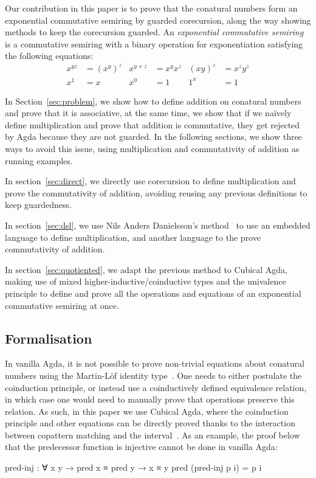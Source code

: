 Our contribution in this paper is to prove that the conatural numbers form an
exponential commutative semiring by guarded corecursion, along the way showing
methods to keep the corecursion guarded. An \emph{exponential commutative
semiring} is a commutative semiring with a binary operation for exponentiation
satisfying the following equations:
\begin{align*}
  x^{yz} &= (x^y)^z & x^{y+z} &= x^y x^z & (xy)^z &= x^z y^z \\
  x^1 &= x & x^0 &= 1 & 1^x &= 1
\end{align*}

In Section~\ref{sec:problem}, we show how to define addition on conatural
numbers and prove that it is associative, at the same time, we show that if we
naïvely define multiplication and prove that addition is commutative, they get
rejected by Agda because they are not guarded. In the following sections, we
show three ways to avoid this issue, using multiplication and commutativity of
addition as running examples.

In section~\ref{sec:direct}, we directly use corecursion to define
multiplication and prove the commutativity of addition, avoiding reusing any
previous definitions to keep guardedness.

In section~\ref{sec:dsl}, we use Nils Anders Danielsson's
method~\cite{danielsson-beating} to use an embedded language to define
multiplication, and another language to the prove commutativity of addition.

In section~\ref{sec:quotiented}, we adapt the previous method to Cubical Agda,
making use of mixed higher-inductive\slash coinductive types and the univalence
principle to define and prove all the operations and equations of an exponential
commutative semiring at once.

\subsection{Formalisation}

In vanilla Agda, it is not possible to prove non-trivial equations about
conatural numbers using the Martin-Löf identity type~\cite{mcbride-unfold}. One
needs to either postulate the coinduction principle, or instead use a
coinductively defined equivalence relation, in which case one would need to
manually prove that operations preserve this relation. As such, in this paper we
use Cubical Agda, where the coinduction principle and other equations can be
directly proved thanks to the interaction between copattern matching and the
interval~\cite{vezzosi-cubical}. As an example, the proof below that the
predecessor function is injective cannot be done in vanilla Agda:
\begin{code}
pred-inj : ∀ {x y} → pred x ≡ pred y → x ≡ y
pred (pred-inj p i) = p i
\end{code}

